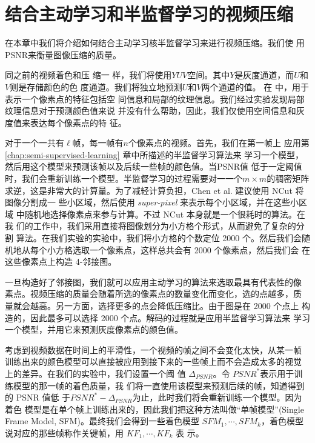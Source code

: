 \chapter{结合主动学习和半监督学习的视频压缩}

在本章中我们将介绍如何结合主动学习核半监督学习来进行视频压缩。我们使
用PSNR来衡量图像压缩的质量。

同之前的视频着色和压
缩\cite{learning-to-compress-images,colorization-using-optimization}一
样，我们将使用$YUV$空间。其中$Y$是灰度通道，而$U$和$V$则是存储颜色的色
度通道。我们将独立地预测$U$和$V$两个通道的值。
在\cite{learning-to-compress-images} 中，用于表示一个像素点的特征包括空
间信息和局部的纹理信息。我们经过实验发现局部纹理信息对于预测颜色值来说
并没有什么帮助，因此，我们仅使用空间信息和灰度值来表达每个像素点的特
征。

对于一个一共有$\ell$帧，每一帧有$n$个像素点的视频。首先，我们在第一帧上
应用第 \ref{chap:semi-supervised-learning} 章中所描述的半监督学习算法来
学习一个模型，然后用这个模型来预测该帧以及后续一些帧的颜色值。当PSNR值
低于一定阈值时，我们会重新训练一个模型。半监督学习的过程需要对一一个$m
\times m$的稠密矩阵求逆，这是非常大的计算量。为了减轻计算负担，Chen et
al. \cite{learning-to-compress-images} 建议使用 NCut
\cite{learning-a-classification-model-for-segmentation} 将图像分割成一
些小区域，然后使用 {\em super-pixel} 来表示每个小区域，并在这些小区域
中随机地选择像素点来参与计算。不过 NCut 本身就是一个很耗时的算法。在我
们的工作中，我们采用直接将图像划分为小方格个形式，从而避免了复杂的分割
算法。在我们实验的实验中，我们将小方格的个数定位 2000 个。然后我们会随
机地从每个小方格选取一个像素点，这样总共会有 2000 个像素点，然后我们会
在这些像素点上构造 4-邻接图。

一旦构造好了邻接图，我们就可以应用主动学习的算法来选取最具有代表性的像
素点。视频压缩的质量会随着所选的像素点的数量变化而变化，选的点越多，质
量就会越高。另一方面，选择更多的点会降低压缩比。由于图是在 2000 个点上
构造的，因此最多可以选择 2000 个点。解码的过程就是应用半监督学习算法来
学习一个模型，并用它来预测灰度像素点的颜色值。

考虑到视频数据在时间上的平滑性，一个视频的帧之间不会变化太快，从某一帧
训练出来的颜色模型可以直接被应用到接下来的一些帧上而不会造成太多的视觉
上的差异。在我们的实验中，我们设置一个阈
值 $\Delta_{PSNR}$。令 $PSNR^{*}$表示用于训练模型的那一帧的着色质量，我
们将一直使用该模型来预测后续的帧，知道得到的 PSNR 值低
于$PSNR^{*}-\Delta_{PSNR}$为止，此时我们将会重新训练一个模型。因为着色
模型是在单个帧上训练出来的，因此我们把这种方法叫做``单帧模型''(Single
Frame Model, SFM)。最终我们会得到一些着色模型 $SFM_1, \cdots,
SFM_k$，着色模型说对应的那些帧称作关键帧，用 $KF_1, \cdots, KF_k$ 表
示。

